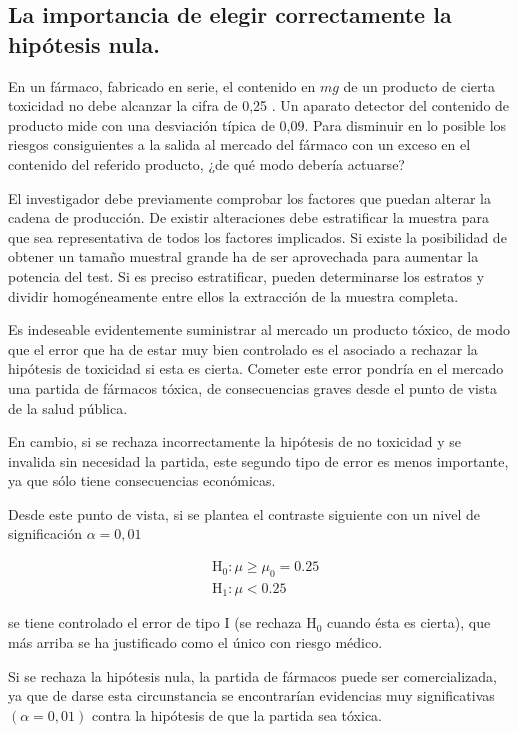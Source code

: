 \documentclass[
]{article}
\begin{document}
\subsection{La importancia de elegir correctamente la hipótesis nula.}\label{la-importancia-de-elegir-correctamente-la-hipuxf3tesis-nula.}

En un fármaco, fabricado en serie, el contenido en \(m g\) de un producto de cierta toxicidad no debe alcanzar la cifra de 0,25 . Un aparato detector del contenido de producto mide con una desviación típica de 0,09. Para disminuir en lo posible los riesgos consiguientes a la salida al mercado del fármaco con un exceso en el contenido del referido producto, ¿de qué modo debería actuarse?

El investigador debe previamente comprobar los factores que puedan alterar la cadena de producción. De existir alteraciones debe estratificar la muestra para que sea representativa de todos los factores implicados. Si existe la posibilidad de obtener un tamaño muestral grande ha de ser aprovechada para aumentar la potencia del test. Si es preciso estratificar, pueden determinarse los estratos y dividir homogéneamente entre ellos la extracción de la muestra completa.

Es indeseable evidentemente suministrar al mercado un producto tóxico, de modo que el error que ha de estar muy bien controlado es el asociado a rechazar la hipótesis de toxicidad si esta es cierta. Cometer este error pondría en el mercado una partida de fármacos tóxica, de consecuencias graves desde el punto de vista de la salud pública.

En cambio, si se rechaza incorrectamente la hipótesis de no toxicidad y se invalida sin necesidad la partida, este segundo tipo de error es menos importante, ya que sólo tiene consecuencias económicas.

Desde este punto de vista, si se plantea el contraste siguiente con un nivel de significación \(\alpha=0,01\)

\[
\begin{aligned}
& \mathrm{H}_{0}: \mu \geq \mu_{0}=0.25 \\
& \mathrm{H}_{1}: \mu<0.25
\end{aligned}
\]

se tiene controlado el error de tipo I (se rechaza \(\mathrm{H}_{0}\) cuando ésta es cierta), que más arriba se ha justificado como el único con riesgo médico.

Si se rechaza la hipótesis nula, la partida de fármacos puede ser comercializada, ya que de darse esta circunstancia se encontrarían evidencias muy significativas \((\alpha=0,01)\) contra la hipótesis de que la partida sea tóxica.
\end{document}
